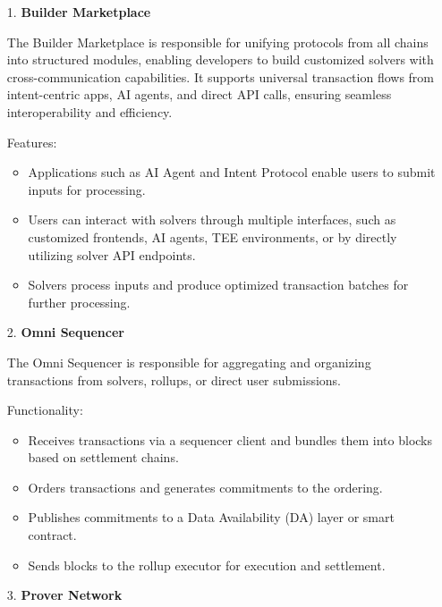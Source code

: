\begin{itemize}
    \item[1.] \textbf{Builder Marketplace}


The Builder Marketplace is responsible for unifying protocols from all chains into structured modules, enabling developers to build customized solvers with cross-communication capabilities. It supports universal transaction flows from intent-centric apps, AI agents, and direct API calls, ensuring seamless interoperability and efficiency.

Features:
    \begin{itemize}
        \item Applications such as AI Agent and Intent Protocol enable users to submit inputs for processing.
        \item Users can interact with solvers through multiple interfaces, such as customized frontends, AI agents, TEE environments, or by directly utilizing solver API endpoints.
        \item Solvers process inputs and produce optimized transaction batches for further processing.
    \end{itemize}

    \item[2.] \textbf{Omni Sequencer}

The Omni Sequencer is responsible for aggregating and organizing transactions from solvers, rollups, or direct user submissions.

Functionality:
    \begin{itemize}
        \item Receives transactions via a sequencer client and bundles them into blocks based on settlement chains.
        \item Orders transactions and generates commitments to the ordering.
        \item Publishes commitments to a Data Availability (DA) layer or smart contract.
        \item Sends blocks to the rollup executor for execution and settlement.
    \end{itemize}
    

    \item[3.] \textbf{Prover Network}


\end{itemize}
